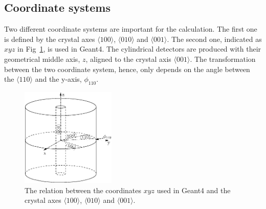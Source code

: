 \subsection{Coordinate systems} 
\label{sec:pss:xyz} 
Two different coordinate systems are important for the
calculation. The first one is defined by the crystal axes $\langle 100
\rangle$, $\langle 010 \rangle$ and $\langle 001 \rangle$. The second
one, indicated as $xyz$ in Fig~\ref{fig:pss:coo}, is used in
Geant4. The cylindrical detectors are produced with their geometrical
middle axis, $z$, aligned to the crystal axis $\langle 001
\rangle$. The transformation between the two coordinate system, hence,
only depends on the angle between the $\langle 110 \rangle$ and the
y-axis, $\phi_{110}$.
\begin{figure} 
\centering 
\includegraphics[width=0.4\textwidth]{coordins}   
\caption{The relation between the coordinates $xyz$ used in Geant4 and
the crystal axes $\langle 100 \rangle$, $\langle 010 \rangle$ and
$\langle 001 \rangle$.}
\label{fig:pss:coo} 
\end{figure} 
 
